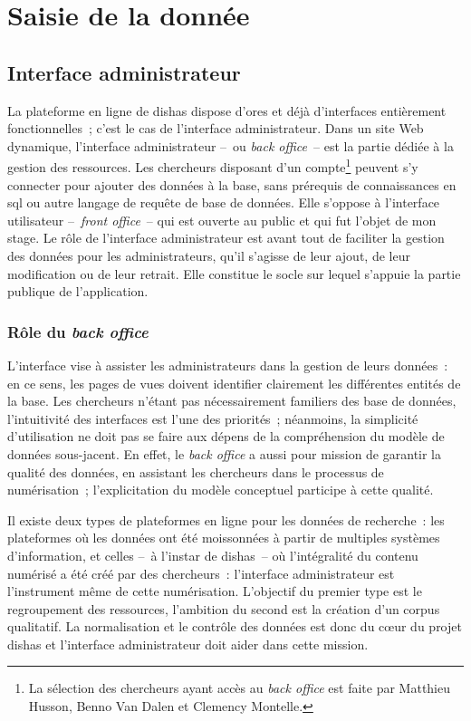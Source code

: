 \documentclass[a4paper,12pt,twoside]{book}
\newcommand{\eng}{\emph}
\newcommand{\bdd}{base de données\xspace}
\newcommand{\dishas}{\gls{dishas}\xspace}
\newcommand{\sql}{\gls{sql}\xspace}
\begin{document}
	\section{Saisie de la donnée}
		\subsection{Interface administrateur}
La plateforme en ligne de \dishas dispose d'ores et déjà d'interfaces entièrement fonctionnelles~; c'est le cas de l'interface administrateur. Dans un site Web dynamique, l'interface administrateur –~ou \eng{back office}~– est la partie dédiée à la gestion des ressources. Les chercheurs disposant d'un compte\footnote{La sélection des chercheurs ayant accès au \eng{back office} est faite par Matthieu Husson, Benno Van Dalen et Clemency Montelle.} peuvent s'y connecter pour ajouter des données à la base, sans prérequis de connaissances en \sql ou autre langage de requête de \bdd. Elle s'oppose à l'interface utilisateur –~\eng{front office}~– qui est ouverte au public et qui fut l'objet de mon stage. Le rôle de l'interface administrateur est avant tout de faciliter la gestion des données pour les administrateurs, qu'il s'agisse de leur ajout, de leur modification ou de leur retrait. Elle constitue le socle sur lequel s'appuie la partie publique de l'application.

			\subsubsection{Rôle du \eng{back office}}
L'interface vise à assister les administrateurs dans la gestion de leurs données~: en ce sens, les pages de vues doivent identifier clairement les différentes entités de la base. Les chercheurs n'étant pas nécessairement familiers des \bdd, l'intuitivité des interfaces est l'une des priorités~; néanmoins, la simplicité d'utilisation ne doit pas se faire aux dépens de la compréhension du modèle de données sous-jacent. En effet, le \eng{back office} a aussi pour mission de garantir la qualité des données, en assistant les chercheurs dans le processus de numérisation~; l'explicitation du modèle conceptuel participe à cette qualité.

Il existe deux types de plateformes en ligne pour les données de recherche~: les plateformes où les données ont été moissonnées à partir de multiples systèmes d'information, et celles –~à l'instar de \dishas~– où l'intégralité du contenu numérisé a été créé par des chercheurs~: l'interface administrateur est l'instrument même de cette numérisation. L'objectif du premier type est le regroupement des ressources, l'ambition du second est la création d'un corpus qualitatif. La normalisation et le contrôle des données est donc du cœur du projet \dishas et l'interface administrateur doit aider dans cette mission.
\end{document}
